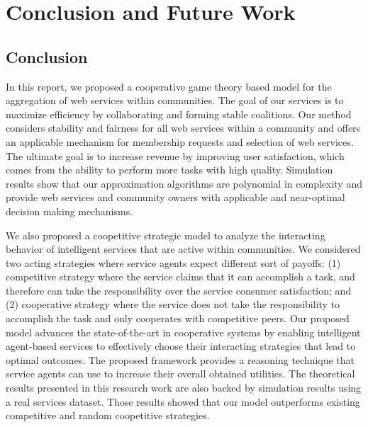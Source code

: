\setcounter{chapter}{3}
\chapter{Conclusion and Future Work}\label{sec:conclusionfuturework}

\section {Conclusion}

In this report, we proposed a cooperative game theory based model for the aggregation of web services within communities.
The goal of our services is to maximize efficiency by collaborating and forming stable
coalitions. Our method considers stability and fairness for all
web services within a community and offers an applicable mechanism
for membership requests and selection of web services. The
ultimate goal is to increase revenue by improving user
satisfaction, which comes from the ability to perform more tasks
with high quality. Simulation results show that our approximation
algorithms are polynomial in complexity and provide web services
and community owners with applicable and near-optimal decision
making mechanisms.

We also proposed a coopetitive strategic model to analyze
the interacting behavior of intelligent services that are active within communities.
We considered two acting strategies where service agents expect different sort of payoffs:
(1) competitive strategy where the service claims that it can accomplish a task,
and therefore can take the responsibility over the service consumer satisfaction; and (2)
cooperative strategy where the service does not take the responsibility to accomplish
the task and only cooperates with competitive peers. Our proposed model advances the
state-of-the-art in cooperative systems by enabling intelligent agent-based services to
effectively choose their interacting strategies that lead to optimal outcomes. The proposed
framework provides a reasoning technique that service agents can use to increase
their overall obtained utilities. The theoretical results presented in this research work are also
backed by simulation results using a real services dataset. Those results showed that
our model outperforms existing competitive and random coopetitive strategies.


